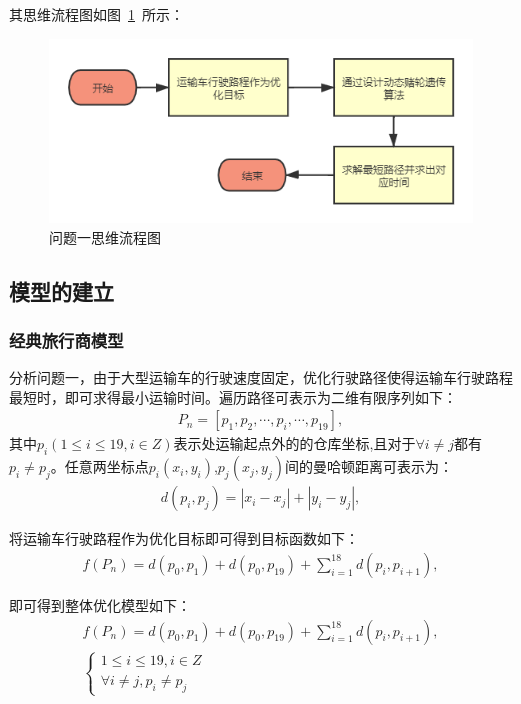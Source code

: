 \documentclass{whutmod}
\begin{document}
    其思维流程图如图~\ref{lct}~所示：

       \begin{figure}[H]
	   	\centering
	   	\includegraphics[width=\textwidth]{figures/abab.png}
	   	\caption{问题一思维流程图}\label{lct}
	   \end{figure}

   
	    \subsection{模型的建立}
	    \subsubsection{经典旅行商模型}
	    分析问题一，由于大型运输车的行驶速度固定，优化行驶路径使得运输车行驶路程最短时，即可求得最小运输时间。遍历路径可表示为二维有限序列如下：
	     \begin{gather}
	    P_n=[p_{1},p_{2},\cdots,p_{i},\cdots,p_{19}] ,
	    \end{gather}
	    其中$p_{i}(1\leqslant i \leqslant 19 ,i\in Z)$表示处运输起点外的的仓库坐标,且对于$\forall i \neq j$都有$p_i \neq p_j $。任意两坐标点$p_i(x_i,y_i)$,$p_j(x_j,y_j)$间的曼哈顿距离可表示为：
	     \begin{gather*}
	     d(p_i,p_j)=\left | x_i-x_j \right |+\left | y_i-y_j \right | ,
	     \end{gather*}
	     
	    将运输车行驶路程作为优化目标即可得到目标函数如下：
	    \begin{gather*}
	    f(P_n)=d(p_0,p_{1})+d(p_0,p_{19})+\sum_{i=1}^{18}d(p_i,p_{i+1}) ,
	    \end{gather*}
	    
	    即可得到整体优化模型如下：
	    \begin{gather}
	    f(P_n)=d(p_0,p_{1})+d(p_0,p_{19})+\sum_{i=1}^{18}d(p_i,p_{i+1}) ,\\
	    \left\{\begin{matrix}1\leqslant i \leqslant 19 ,i\in Z
	    \\ \forall i \neq j,p_i \neq p_j 
	    \end{matrix}\right.
        \end{gather}
        
\end{document}

